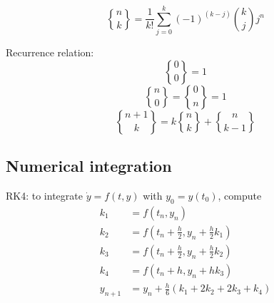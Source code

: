 $${n \brace k}=\frac{1}{k!}\sum_{j=0}^{k}(-1)^{(k-j)}{k \choose j}j^n$$

Recurrence relation:
\vspace{-\baselineskip}
  $${0 \brace 0}=1$$
  $${n \brace 0}={0 \brace n}=1$$
  $${n+1 \brace k}=k{n \brace k}+{n \brace k-1}$$
\vspace{-\baselineskip}
\subsection{Numerical integration}
RK4: to integrate $\dot{y} = f(t, y)$ with $y_0 = y(t_0)$, compute
\begin{align*}
  k_1 &= f(t_n, y_n) \\
  k_2 &= f(t_n + \frac h 2, y_n + \frac h 2 k_1) \\
  k_3 &= f(t_n + \frac h 2, y_n + \frac h 2 k_2) \\
  k_4 &= f(t_n + h, y_n + h k_3) \\
  y_{n+1} &= y_n + \frac h 6 (k_1 + 2k_2 + 2k_3 + k_4) 
\end{align*}
